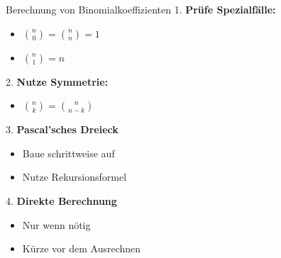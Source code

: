 \begin{KR}{Berechnung von Binomialkoeffizienten}
1. \textbf{Prüfe Spezialfälle:}
   \begin{itemize}
   \item $\binom{n}{0} = \binom{n}{n} = 1$
   \item $\binom{n}{1} = n$
   \end{itemize}

2. \textbf{Nutze Symmetrie:}
   \begin{itemize}
   \item $\binom{n}{k} = \binom{n}{n-k}$
   \end{itemize}

3. \textbf{Pascal'sches Dreieck}
   \begin{itemize}
   \item Baue schrittweise auf
   \item Nutze Rekursionsformel
   \end{itemize}

4. \textbf{Direkte Berechnung}
   \begin{itemize}
   \item Nur wenn nötig
   \item Kürze vor dem Ausrechnen
   \end{itemize}
\end{KR}